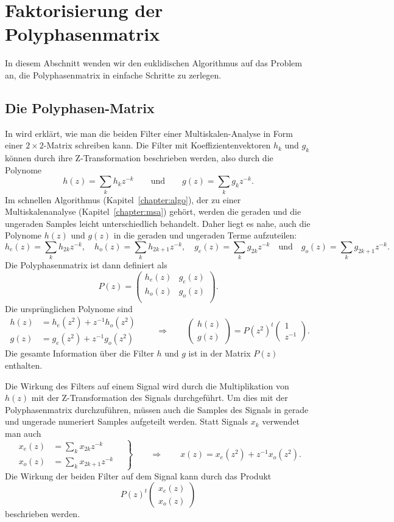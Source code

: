 %
%
\section{Faktorisierung der Polyphasenmatrix}
In diesem Abschnitt wenden wir den euklidischen Algorithmus auf das
Problem an, die Polyphasenmatrix in einfache Schritte zu zerlegen.

\subsection{Die Polyphasen-Matrix}
In \cite{fpga:Daubechies1998} wird erklärt, wie man die beiden
Filter einer Multiskalen-Analyse in Form einer $2\times 2$-Matrix
schreiben kann.
Die Filter mit Koeffizientenvektoren $h_k$ und $g_k$ können durch 
ihre Z-Transformation beschrieben werden, also durch die Polynome
\[
h(z) = \sum_{k} h_kz^{-k}
\qquad\text{und}\qquad
g(z) = \sum_{k} g_kz^{-k}.
\]
Im schnellen Algorithmus (Kapitel~\ref{chapter:algo}), der zu einer
Multiskalenanalyse (Kapitel~\ref{chapter:msa}) gehört, werden die
geraden und die ungeraden Samples leicht unterschiedlich behandelt.
Daher liegt es nahe, auch die Polynome $h(z)$ und $g(z)$ in die
geraden und ungeraden Terme aufzuteilen:
\[
h_e(z) = \sum_k h_{2k}z^{-k},
\quad
h_o(z) = \sum_k h_{2k+1}z^{-k},
\quad
g_e(z) = \sum_k g_{2k}z^{-k}
\quad\text{und}\quad
g_o(z) = \sum_k g_{2k+1}z^{-k}.
\]
Die Polyphasenmatrix ist dann definiert als
\[
P(z)
=
\begin{pmatrix}
h_e(z)&g_e(z)\\
h_o(z)&g_o(z)\\
\end{pmatrix}.
\]
Die ursprünglichen Polynome sind
\[
\begin{aligned}
h(z) &= h_e(z^2) + z^{-1}h_o(z^2)\\
g(z) &= g_e(z^2) + z^{-1}g_o(z^2)
\end{aligned}
\qquad\Rightarrow\qquad
\begin{pmatrix}
h(z)\\
g(z)
\end{pmatrix}
=
P(z^2)^t
\begin{pmatrix} 1\\ z^{-1} \end{pmatrix}.
\]
Die gesamte Information über die Filter $h$ und $g$ ist in der Matrix
$P(z)$ enthalten.

Die Wirkung des Filters auf einem Signal wird durch die Multiplikation
von $h(z)$ mit der Z-Transformation des Signals durchgeführt.
Um dies mit der Polyphasenmatrix durchzuführen, müssen auch die Samples
des Signals in gerade und ungerade numeriert Samples aufgeteilt werden.
Statt Signals $x_k$ verwendet man auch
\[
\left.
\begin{aligned}
x_e(z) &= \sum_k x_{2k}z^{-k} \\
x_o(z) &= \sum_k x_{2k+1}z^{-k}
\end{aligned}
\quad\right\}
\qquad
\Rightarrow
\qquad
x(z) = x_e(z^2) + z^{-1} x_o(z^2).
\]
Die Wirkung der beiden Filter auf dem Signal kann durch das Produkt
\[
P(z)^t \begin{pmatrix} x_e(z)\\ x_o(z) \end{pmatrix}
\]
beschrieben werden.

